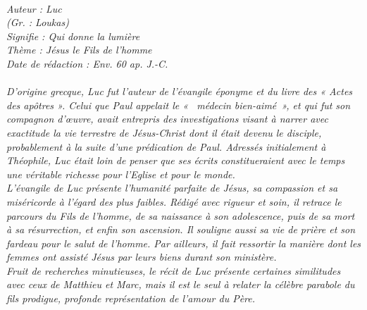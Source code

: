 \BFont
\noindent\hrulefill
{\footnotesize
\textit{
\bigskip
{\centering{}
\\Auteur : Luc
\\(Gr. : Loukas)
\\Signifie : Qui donne la lumière
\\Thème : Jésus le Fils de l'homme
\\Date de rédaction : Env. 60 ap. J.-C.\\}
}
\textit{
\\D’origine grecque, Luc fut l’auteur de l’évangile éponyme et du livre des « Actes des apôtres ». Celui que Paul appelait le «~ médecin bien-aimé~», et qui fut son compagnon d’œuvre, avait entrepris des investigations visant à narrer avec exactitude la vie terrestre de Jésus-Christ dont il était devenu le disciple, probablement à la suite d'une prédication de Paul. Adressés initialement à Théophile, Luc était loin de penser que ses écrits constitueraient avec le temps une véritable richesse pour l’Eglise et pour le monde.
\\L’évangile de Luc présente l’humanité parfaite de Jésus, sa compassion et sa miséricorde à l’égard des plus faibles. Rédigé avec rigueur et soin, il retrace le parcours du Fils de l’homme, de sa naissance à son adolescence, puis de sa mort à sa résurrection, et enfin son ascension. Il souligne aussi sa vie de prière et son fardeau pour le salut de l’homme. Par ailleurs, il fait ressortir la manière dont les femmes ont assisté Jésus par leurs biens durant son ministère.
\\Fruit de recherches minutieuses, le récit de Luc présente certaines similitudes avec ceux de Matthieu et Marc, mais il est le seul à relater la célèbre parabole du fils prodigue, profonde représentation de l’amour du Père.\bigskip
}
}
\par\nobreak\noindent\hrulefill
